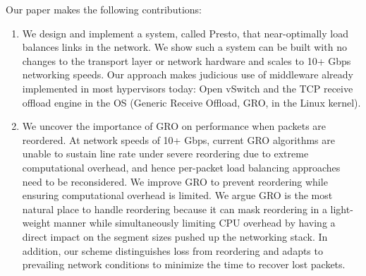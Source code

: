 
Our paper makes the following contributions:
\begin{enumerate}

\item We design and implement a system, called Presto, that near-optimally load balances
links in the network. We show such a system can be built with no changes to the transport
layer or network hardware and scales to 10+ Gbps networking speeds.
Our approach makes judicious use of middleware
already implemented in most hypervisors today: Open vSwitch and the TCP receive offload engine in the OS
(Generic Receive Offload, GRO, in the Linux kernel).

\item We uncover the importance of GRO on performance when packets are reordered.
At network speeds of 10+ Gbps, current GRO algorithms are unable to sustain line rate under 
severe reordering due to extreme computational overhead, and hence 
per-packet load balancing approaches~\cite{drb,packetspray} need to be reconsidered. We
improve GRO to prevent reordering while ensuring computational overhead is limited.
We argue
GRO is the most natural place to handle reordering because it can mask
reordering in a light-weight manner while simultaneously limiting CPU overhead by having a direct impact
on the segment sizes pushed up the networking stack.
In addition, our scheme distinguishes loss from reordering and adapts to prevailing network conditions
to minimize the time to recover lost packets.


\end{enumerate}
